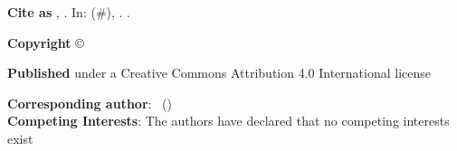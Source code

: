 \begin{minipage}{\headwidth}
\vfill
\begin{framed}
  \footnotesize \sf

  \ifdefempty{\articleDOI}{
    \textcolor{darkred}{\large \bfseries Non peer-reviewed author version}
  }
  {\textbf{Cite as} \articleTITLE, \authorsABBRV.
                     In: {\em \journalNAME}
                     \journalVOLUME(\#\articleNUMBER), \articleYEAR.
                     .\par}

%

\textbf{Copyright} ©~\articleYEAR~\authorsABBRV\par
\textbf{Published} under a Creative Commons Attribution 4.0 International license
\href{https://creativecommons.org/licenses/by/4.0/}{\ExternalLink}\par
%
\textbf{Corresponding author}:
\contactNAME~(\href{mailto:\contactEMAIL}{\contactEMAIL})\\
\textbf{Competing Interests}:
The authors have declared that no competing interests exist\par
\end{framed}

  
%
\end{minipage}


\clearpage

